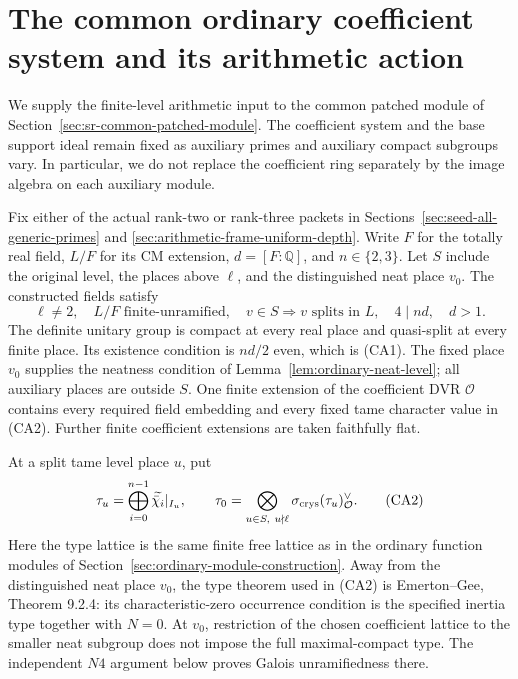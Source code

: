 \section{The common ordinary coefficient system and its arithmetic action}
\label{sec:common-ordinary-arithmetic-action}

We supply the finite-level arithmetic input to the common
patched module of Section~\ref{sec:sr-common-patched-module}.
The coefficient system and the base support ideal remain fixed
as auxiliary primes and auxiliary compact subgroups vary.
In particular, we do not replace the coefficient ring separately
by the image algebra on each auxiliary module.

Fix either of the actual rank-two or rank-three packets in
Sections~\ref{sec:seed-all-generic-primes} and
\ref{sec:arithmetic-frame-uniform-depth}.
Write \(F\) for the totally real field, \(L/F\) for its CM
extension, \(d=[F:\mathbb Q]\), and \(n\in\{2,3\}\).
Let \(S\) include the original level, the places above \(\ell\),
and the distinguished neat place \(v_0\).
The constructed fields satisfy
\[
 \ell\ne2,\quad L/F\text{ finite-unramified},\quad
 v\in S\Longrightarrow v\text{ splits in }L,\quad
 4\mid nd,\quad d>1.                                      \tag{CA1}
\]
The definite unitary group is compact at every real place
and quasi-split at every finite place.
Its existence condition is \(nd/2\) even, which is (CA1).
The fixed place \(v_0\) supplies the neatness condition of
Lemma~\ref{lem:ordinary-neat-level}; all auxiliary places
are outside \(S\).
One finite extension of the coefficient DVR \(\mathcal O\)
contains every required field embedding and every fixed
tame character value in (CA2). Further finite coefficient extensions
are taken faithfully flat.

At a split tame level place \(u\), put
\[
 \tau_u=\bigoplus_{i=0}^{n-1}\widetilde{\bar\chi_i}|_{I_u},
 \qquad
 \tau_0=\bigotimes_{u\in S,\ u\nmid\ell}
              \sigma_{\rm crys}(\tau_u)^\vee_{\mathcal O}.  \tag{CA2}
\]
Here the type lattice is the same finite free lattice as in
the ordinary function modules of
Section~\ref{sec:ordinary-module-construction}.
Away from the distinguished neat place \(v_0\), the
type theorem used in (CA2) is
Emerton--Gee, Theorem 9.2.4: its characteristic-zero occurrence
condition is the specified inertia type together with \(N=0\).
At \(v_0\), restriction of the chosen coefficient lattice
to the smaller neat subgroup does not impose the full
maximal-compact type. The independent \(N4\) argument
below proves Galois unramifiedness there.

